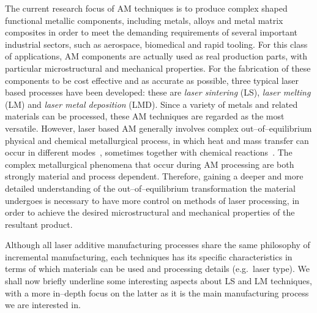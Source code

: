 The current research focus of AM techniques is to produce complex shaped functional metallic components, including metals, alloys and metal matrix composites in order to meet the demanding requirements of several important industrial sectors, such as aerospace, biomedical and rapid tooling. For this class of applications, AM components are actually used as real production parts, with particular microstructural and mechanical properties. For the fabrication of these components to be cost effective and as accurate as possible, three typical laser based processes have been developed: these are \emph{laser sintering} (LS), \emph{laser melting} (LM) and \emph{laser metal deposition} (LMD). Since a variety of metals and related materials can be processed, these AM techniques are regarded as the most versatile. However, laser based AM generally involves complex out--of--equilibrium physical and chemical metallurgical process, in which heat and mass transfer can occur in different modes~\cites{GuReview54}{GuReview55}, sometimes together with chemical reactions~\cites{GuReview57}{GuReview58}.%
The complex metallurgical phenomena that occur during AM processing are both strongly material %
and process dependent. %
Therefore, gaining a deeper and more detailed understanding of the out--of--equilibrium transformation the material undergoes is necessary to have more control on methods of laser processing, in order to achieve the desired microstructural and mechanical properties of the resultant product.

Although all laser additive manufacturing processes share the same philosophy of incremental manufacturing, each techniques has its specific characteristics in terms of which materials can be used and processing details (e.g.\ laser type). We shall now briefly underline some interesting aspects about LS and LM techniques, with a more in--depth focus on the latter as it is the main manufacturing process we are interested in.

